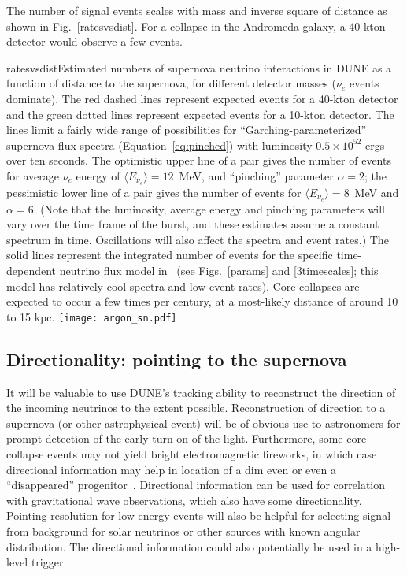 The number of signal events scales with mass and inverse square of distance as shown in Fig.~\ref{ratesvsdist}.  For a collapse in the Andromeda galaxy, a 40-kton detector would observe a few events.

\begin{dunefigure}{ratesvsdist}{Estimated numbers of supernova neutrino interactions in DUNE as a function of distance to the supernova, for different detector masses ($\nu_e$ events dominate). The red dashed lines represent expected events for a 40-kton detector and the green dotted lines represent expected events for a 10-kton detector. The lines limit a fairly wide range of possibilities for ``Garching-parameterized'' supernova flux spectra (Equation~\ref{eq:pinched}) with luminosity $0.5\times 10^{52}$ ergs over ten seconds. The optimistic upper line of a pair gives the number of events for average $\nu_e$ energy of $\langle E_{\nu_e}\rangle =12$~MeV, and ``pinching'' parameter $\alpha=2$; the pessimistic lower line of a pair gives the number of events for $\langle E_{\nu_e}\rangle=8$~MeV and $\alpha=6$. (Note that the luminosity, average energy and pinching parameters will vary over the time frame of the burst, and these estimates assume a constant spectrum in time. Oscillations will also affect the spectra and event rates.) The solid lines represent the integrated number of events for the specific time-dependent neutrino flux model in~\cite{Huedepohl:2009wh} (see Figs.~\ref{params} and \ref{3timescales}; this model has relatively cool spectra and low event rates). Core collapses are expected to occur a few times per century, at a most-likely distance of around 10 to 15 kpc.}
\texttt{[image: argon\_sn.pdf]}
\end{dunefigure}


\subsection{Directionality: pointing to the supernova}



It will be valuable to use DUNE's tracking ability to reconstruct the direction of the incoming neutrinos to the extent possible.  Reconstruction of direction to a supernova (or other astrophysical event) will be of obvious use to astronomers for prompt detection of the early turn-on of the light.  Furthermore, some core collapse events may not yield bright electromagnetic fireworks, in which case directional information may help in location of a dim even or even a ``disappeared'' progenitor~\cite{Kochanek:2008mp}.
Directional information can be used for correlation with gravitational
wave observations, which also have some directionality.  Pointing
resolution for low-energy events will also be helpful for selecting
signal from background for solar neutrinos or other sources with known
angular distribution.  The directional information could also
potentially be used in a high-level trigger.

